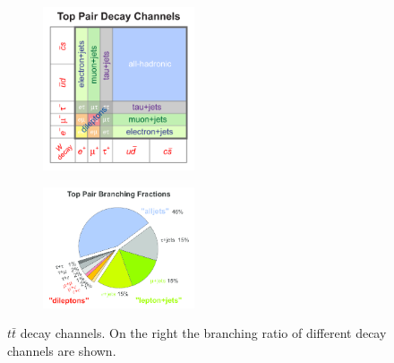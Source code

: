 \begin{figure}[h]
\centering
\begin{subfigure}
  \centering
  \includegraphics[width=0.49\textwidth]{01_Theory_SM/plots/top_pair_decay_channels.png}
\end{subfigure}
\begin{subfigure}
  \centering
  \includegraphics[width=0.49\textwidth]{01_Theory_SM/plots/top_pair_branching_frac.png}
\end{subfigure}
\caption{$t\bar{t}$ decay channels. On the right the branching ratio of different decay channels are shown.}
  \label{fig:tt_decay}
\end{figure}

